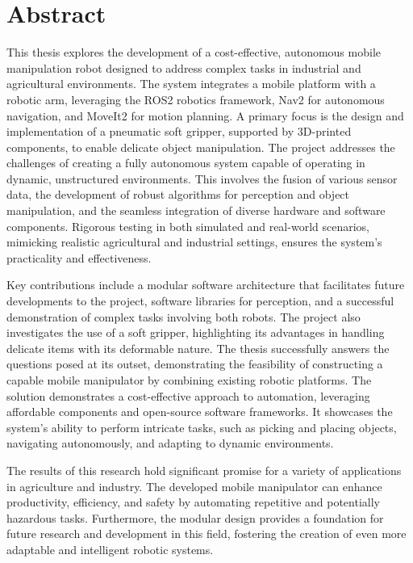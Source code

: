 
\chapter*{Abstract}

This thesis explores the development of a cost-effective, autonomous mobile manipulation robot designed 
to address complex tasks in industrial and agricultural environments. The system integrates a mobile platform with
a robotic arm, leveraging the ROS2 robotics framework, Nav2 for autonomous navigation, and MoveIt2 for motion planning. 
A primary focus is the design and implementation of a pneumatic soft gripper, supported by 3D-printed components, 
to enable delicate object manipulation.
The project addresses the challenges of creating a fully autonomous system capable of operating in dynamic,
unstructured environments. This involves the fusion of various sensor data, the development 
of robust algorithms for perception and object manipulation, and the seamless integration of diverse hardware
and software components. Rigorous testing in both simulated and real-world scenarios, mimicking realistic 
agricultural and industrial settings, ensures the system's practicality and effectiveness.

Key contributions include a modular software architecture that facilitates future developments to the project,
software libraries for perception, and a successful demonstration of complex 
tasks involving both robots. The project also investigates the use of a soft gripper,
highlighting its advantages in handling delicate items with its deformable nature.
The thesis successfully answers the questions posed at its outset, demonstrating the feasibility of constructing 
a capable mobile manipulator by combining existing robotic platforms. The solution demonstrates a cost-effective 
approach to automation, leveraging affordable components and open-source software frameworks. 
It showcases the system's ability to perform intricate tasks, such as picking and placing objects,
navigating autonomously, and adapting to dynamic environments.

The results of this research hold significant promise for a variety of applications in agriculture and industry.
The developed mobile manipulator can enhance productivity, efficiency, and safety by automating repetitive and potentially 
hazardous tasks. Furthermore, the modular design provides a foundation for future 
research and development in this field, fostering the creation of even more adaptable and intelligent robotic systems.

